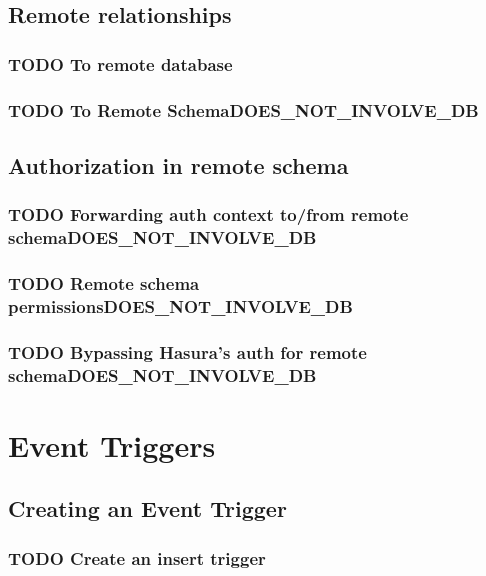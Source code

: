 \documentclass[11pt]{article}
\begin{document}
\subsection{Remote relationships}
\label{sec:org5772a0f}
\subsubsection{{\bfseries\sffamily TODO} To remote database}
\label{sec:org3e3361c}
\subsubsection{{\bfseries\sffamily TODO} To Remote Schema\hfill{}\textsc{DOES\_NOT\_INVOLVE\_DB}}
\label{sec:orgf41fcb8}
\subsection{Authorization in remote schema}
\label{sec:orgebc8a5c}
\subsubsection{{\bfseries\sffamily TODO} Forwarding auth context to/from remote schema\hfill{}\textsc{DOES\_NOT\_INVOLVE\_DB}}
\label{sec:orge5898cd}
\subsubsection{{\bfseries\sffamily TODO} Remote schema permissions\hfill{}\textsc{DOES\_NOT\_INVOLVE\_DB}}
\label{sec:org6c8727e}
\subsubsection{{\bfseries\sffamily TODO} Bypassing Hasura's auth for remote schema\hfill{}\textsc{DOES\_NOT\_INVOLVE\_DB}}
\label{sec:orgc25b9f8}
\section{Event Triggers}
\label{sec:orgd8526a4}
\subsection{Creating an Event Trigger}
\label{sec:org3794c0b}
\subsubsection{{\bfseries\sffamily TODO} Create an insert trigger}
\label{sec:orgd69a9d0}
\end{document}
